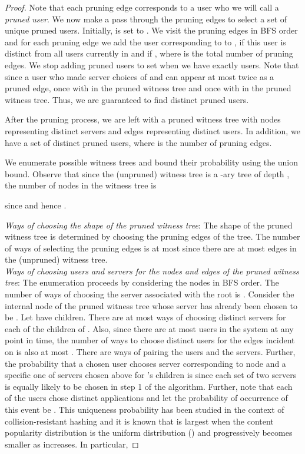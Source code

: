 \documentclass[conference]{IEEEtran}
\begin{document}
\begin{proof}
 Note that each pruning edge corresponds to a user who we will call a {\em pruned user}. We now make a pass through the pruning edges to select a set  of unique pruned users. Initially,  is set to . We visit the pruning edges in BFS order and for each pruning edge  we add the user corresponding to  to , if this user is distinct from all users currently in  and if , where  is the total number of pruning edges. We stop adding pruned users to set  when we have exactly   users. Note that since a user who made server choices of  and  can appear at most twice as a pruned edge, once with  in the pruned witness tree and once with  in the pruned witness tree. Thus, we are guaranteed to find  distinct pruned users. 
 
After the pruning process, we are left with a pruned witness tree with nodes representing distinct servers and edges representing distinct users. In addition, we have a set  of  distinct pruned users, where  is the number of pruning edges. 

We enumerate possible witness trees and bound their probability using the union bound. Observe that since the (unpruned) witness tree is a -ary tree of depth , the number of nodes in the witness tree is 

since  and hence .

{\em Ways of choosing the shape of the pruned witness tree}:
The shape of the pruned witness tree is determined by choosing the  pruning edges of the tree. The number of ways of selecting the  pruning edges is at most  since there are at most  edges in the (unpruned) witness tree. \\
{\em Ways of choosing users and
servers for the nodes and edges of the pruned witness tree}: The enumeration
proceeds by considering the nodes in BFS order.  The number of ways of
choosing the server associated with the root is . Consider the  internal node  of the pruned witness tree
whose server has already been chosen to be . Let  have 
children. There are at most  ways of
choosing distinct servers for each of the  children of
.  Also, since there are at most  users in the system
at any point in time, the number of ways to choose 
distinct users for the
 edges incident on  is also at most
. There are 
ways of pairing the users and the servers.
Further, the probability that a chosen user
chooses server  corresponding to node  and a specific one of
 servers chosen above for 's children is  since each set of two servers is equally likely to be chosen in step 1 of the algorithm. Further, note that each of the  users chose  distinct applications and let the probability of occurrence of this event be . This uniqueness probability has been studied in the context of collision-resistant hashing and it is known \cite{bellare2004hash} that
 is largest when the content popularity distribution is the uniform distribution () and progressively becomes smaller as  increases. In particular, 


\end{proof}
\end{document}
